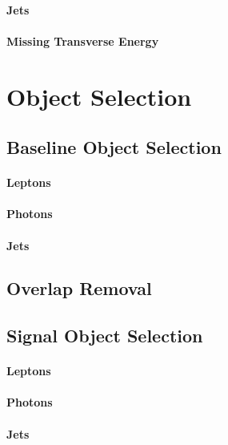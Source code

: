 		\paragraph*{Jets}

		\paragraph*{Missing Transverse Energy}

			 



	\section{Object Selection}
	\label{sec:objSel}

		\subsection{Baseline Object Selection}
		\label{subsec:baseObjSel}

			\paragraph*{Leptons}
			
			\paragraph*{Photons}
			
			\paragraph*{Jets}


		\subsection{Overlap Removal}
		\label{subsec:OR}

		\subsection{Signal Object Selection}
		\label{subsec:sigObjSel}

			\paragraph*{Leptons}

			\paragraph*{Photons}

			\paragraph*{Jets}